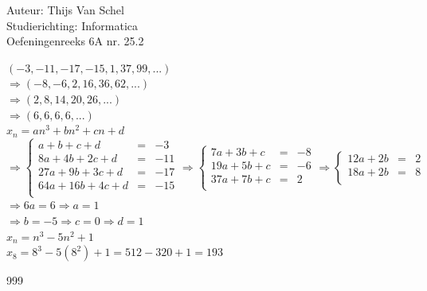\documentclass[a4paper]{article}
\begin{document}
  
\noindent \large Auteur: Thijs Van Schel\\
\noindent \large Studierichting: Informatica\\
\noindent \large Oefeningenreeks 6A nr. 25.2 \\

\medskip

\normalsize

$(-3, -11, -17, -15, 1, 37, 99, ...)$\\

$\Rightarrow (-8, -6, 2, 16, 36, 62, ...)$\\

$\Rightarrow (2, 8, 14, 20, 26, ...)$\\

$\Rightarrow (6, 6, 6, 6, ...)$\\

$x_n = an^3 + bn^2 + cn + d$\\

$\Rightarrow \left\{
    \begin{array}{lcr}
         a +  b +  c + d & = & -3\\
        8a + 4b + 2c + d & = & -11\\
       27a + 9b + 3c + d & = & -17\\
       64a + 16b + 4c + d & = & -15\\
    \end{array}
\right. \Rightarrow \left\{
    \begin{array}{lcr}
         7a + 3b + c & = & -8\\
        19a + 5b + c & = & -6\\
        37a + 7b + c & = & 2\\
    \end{array}
\right. \Rightarrow \left\{
    \begin{array}{lcr}
        12a + 2b & = & 2\\
        18a + 2b & = & 8\\
    \end{array}
\right.$\\

$\Rightarrow 6a = 6 \Rightarrow a = 1$\\

$\Rightarrow b = -5 \Rightarrow c = 0 \Rightarrow d = 1$\\

$x_n = n^3 - 5n^2 + 1$\\

$x_8 = 8^3 - 5(8^2) + 1 = 512 - 320 + 1 = 193$\\

\begin{thebibliography}{999}
\end{thebibliography}
\end{document}
